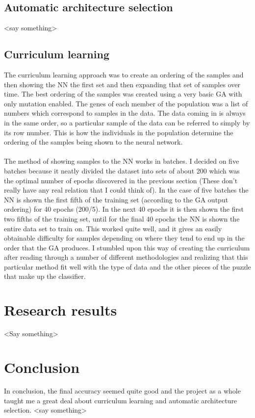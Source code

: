 \documentclass[conference]{IEEEtran}
\begin{document}
\subsection{Automatic architecture selection}
<say something>

\subsection{Curriculum learning}
The curriculum learning approach was to create an ordering of the samples and then showing the NN the first set and then expanding that set of samples over time. The best ordering of the samples was created using a very basic GA with only mutation enabled. The genes of each member of the population was a list of numbers which correspond to samples in the data. The data coming in is always in the same order, so a particular sample of the data can be referred to simply by its row number. This is how the individuals in the population determine the ordering of the samples being shown to the neural network.
\\\\
The method of showing samples to the NN works in batches. I decided on five batches because it neatly divided the dataset into sets of about 200 which was the optimal number of epochs discovered in the previous section (These don't really have any real relation that I could think of). In the case of five batches the NN is shown the first fifth of the training set (according to the GA output ordering) for 40 epochs (200/5). In the next 40 epochs it is then shown the first two fifths of the training set, until for the final 40 epochs the NN is shown the entire data set to train on.
This worked quite well, and it gives an easily obtainable difficulty for samples depending on where they tend to end up in the order that the GA produces. I stumbled upon this way of creating the curriculum after reading through a number of different methodologies and realizing that this particular method fit well with the type of data and the other pieces of the puzzle that make up the classifier. 

\section{Research results}
<Say something>

\section{Conclusion}
In conclusion, the final accuracy seemed quite good and the project as a whole taught me a great deal about curriculum learning and automatic architecture selection.
<say something>
\end{document}
